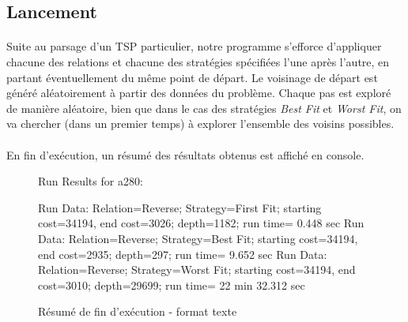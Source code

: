 \documentclass[a4paper,10pt]{report}
\begin{document}
\subsection{Lancement}

\paragraph{}
  Suite au parsage d'un TSP particulier, notre programme s'efforce d'appliquer chacune des relations et chacune
des stratégies spécifiées l'une après l'autre, en partant éventuellement du même point de départ. Le voisinage de
départ est généré aléatoirement à partir des données du problème. Chaque pas est exploré de manière aléatoire, bien
que dans le cas des stratégies \textit{Best Fit} et \textit{Worst Fit}, on va chercher (dans un premier temps) à
explorer l'ensemble des voisins possibles.

\paragraph{}
En fin d'exécution, un résumé des résultats obtenus est affiché en console.

\begin{figure}[h]
Run Results for a280:
 \begin{center}
Run Data: Relation=Reverse;	Strategy=First Fit;	starting cost=34194,	end cost=3026;	depth=1182;	run time= 0.448 sec\linebreak
Run Data: Relation=Reverse;	Strategy=Best Fit;	starting cost=34194,	end cost=2935;	depth=297;	run time= 9.652 sec\linebreak
Run Data: Relation=Reverse;	Strategy=Worst Fit;	starting cost=34194,	end cost=3010;	depth=29699;	run time= 22 min 32.312 sec\linebreak
 \end{center}
  \label{a280-sample-results}
  \caption{Résumé de fin d'exécution - format texte}
\end{figure}
\end{document}
